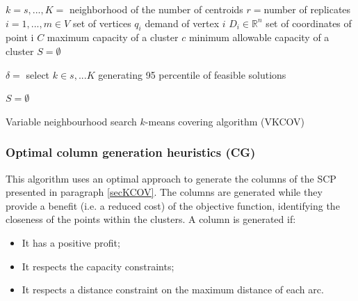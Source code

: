 \begin{algorithm}[H]
\DontPrintSemicolon
\SetAlgoLined

$k=s,...,K =$ neighborhood of the number of centroids \;
$r=$number of replicates\;
$i=1,...,m \in V$ set of vertices \;
$q_i$ demand of vertex $i$ \;
$D_i \in \mathbb{R}^n $ set of coordinates of point i \;
$C$ maximum capacity of a cluster \;
$c$ minimum allowable capacity of a cluster \;
$S= \emptyset $ \;

$\delta = $ select $k \in s,...K$ generating 95 percentile of feasible solutions\;
 
$S= \emptyset $ \;

\caption{Variable neighbourhood search $k$-means covering algorithm (VKCOV)}
\label{algo_dist_VKCOV}    

\end{algorithm}

\subsubsection{Optimal column generation heuristics (CG)}
This algorithm uses an optimal approach to generate the columns of the SCP presented in paragraph \ref{secKCOV}. The columns are generated while they provide a benefit (i.e. a reduced cost) of the objective function, identifying the closeness of the points within the clusters. A column is generated if:

\begin{itemize}
    \item It has a positive profit;
    \item It respects the capacity constraints;
    \item It respects a distance constraint on the maximum distance of each arc.
\end{itemize}

